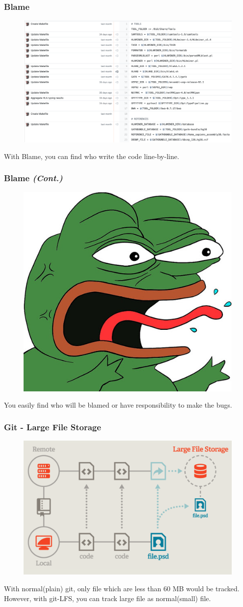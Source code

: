\documentclass[aspectratio=169]{beamer}
\begin{document}
	\begin{frame}
		\frametitle{Blame}
		
		\begin{figure}
			\centering
			\includegraphics[width=0.5 \linewidth]{figures/blame.png}
		\end{figure}
	
		With Blame, you can find who write the code line-by-line.
	\end{frame}

	\begin{frame}
		\frametitle{Blame \textit{(Cont.)}}
		
		\begin{figure}
			\centering
			\includegraphics[width=0.3 \linewidth]{figures/blame.jpg}
		\end{figure}
	
		You easily find who will be blamed or have responsibility to make the bugs. 
	\end{frame}

	\begin{frame}
		\frametitle{Git - Large File Storage}
		
		\begin{figure}
			\centering
			\includegraphics[width=0.4 \linewidth]{figures/lfs.png}
		\end{figure}
		
		With normal(plain) git, only file which are less than 60 MB would be tracked. \\
		However, with git-LFS, you can track large file as normal(small) file. 
	\end{frame}
\end{document}
